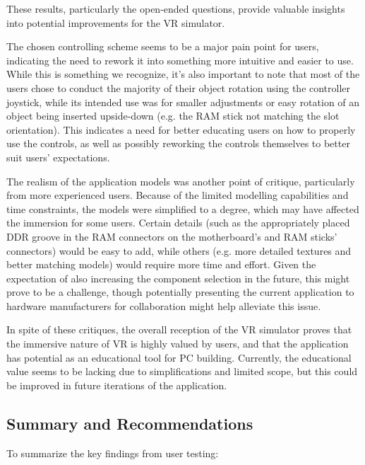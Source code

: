 These results, particularly the open-ended questions, provide valuable insights into potential improvements for the VR simulator.

The chosen controlling scheme seems to be a major pain point for users, indicating the need to rework it into something more intuitive and easier to use.
While this is something we recognize, it's also important to note that most of the users chose to conduct the majority of their object rotation using the controller joystick, while its intended use was for smaller adjustments or easy rotation of an object being inserted upside-down (e.g. the RAM stick not matching the slot orientation).
This indicates a need for better educating users on how to properly use the controls, as well as possibly reworking the controls themselves to better suit users' expectations.

The realism of the application models was another point of critique, particularly from more experienced users.
Because of the limited modelling capabilities and time constraints, the models were simplified to a degree, which may have affected the immersion for some users.
Certain details (such as the appropriately placed DDR groove in the RAM connectors on the motherboard's and RAM sticks' connectors) would be easy to add, while others (e.g. more detailed textures and better matching models) would require more time and effort.
Given the expectation of also increasing the component selection in the future, this might prove to be a challenge, though potentially presenting the current application to hardware manufacturers for collaboration might help alleviate this issue.

In spite of these critiques, the overall reception of the VR simulator proves that the immersive nature of VR is highly valued by users, and that the application has potential as an educational tool for PC building.
Currently, the educational value seems to be lacking due to simplifications and limited scope, but this could be improved in future iterations of the application.

\subsection{Summary and Recommendations}
\label{sec:user-testing-summary}

To summarize the key findings from user testing:


